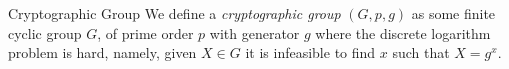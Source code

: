 \begin{definitiontoc}{Cryptographic Group}
    We define a \emph{cryptographic group} $(G, p, g)$ as some finite cyclic group $G$, of prime order $p$ with generator $g$ where the discrete logarithm problem is hard, namely, given $X \in G$ it is infeasible to find $x$ such that $X = g^x$.
\end{definitiontoc}

% 
